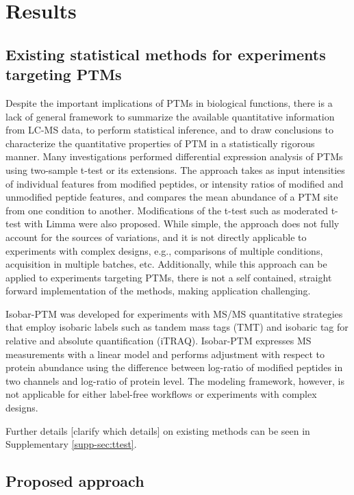 \documentclass[mcp]{article}
\numberwithin{figure}{section} %
\numberwithin{table}{section}
\def\todo#1{{\color{red}[#1]}}
\begin{document}
\section*{Results}

\subsection*{Existing statistical methods for experiments targeting PTMs}

Despite the important implications of PTMs in biological functions, there is a lack of general framework to summarize the available quantitative information from LC-MS data, to perform statistical inference, and to draw conclusions to characterize the quantitative properties of PTM in a statistically rigorous manner. Many investigations performed differential expression analysis of PTMs using two-sample t-test or its extensions. The approach takes as input intensities of individual features from modified peptides, or intensity ratios of modified and unmodified peptide features, and compares the mean abundance of a PTM site from one condition to another. Modifications of the t-test such as moderated t-test with Limma were also proposed.\cite{Zhu} While simple, the approach does not fully account for the sources of variations, and it is not directly applicable to experiments with complex designs, e.g., comparisons of multiple conditions, acquisition in multiple batches, etc. Additionally, while this approach can be applied to experiments targeting PTMs, there is not a self contained, straight forward implementation of the methods, making application challenging. 

Isobar-PTM was developed for experiments with MS/MS quantitative strategies that employ isobaric labels such as tandem mass tags (TMT) and isobaric tag for relative and absolute quantification (iTRAQ).\cite{Breitwieser:2013} Isobar-PTM expresses MS measurements with a linear model and performs adjustment with respect to protein abundance using the difference between log-ratio of modified peptides in two channels and log-ratio of protein level. The modeling framework, however, is not applicable for either label-free workflows or experiments with complex designs. 

Further details \todo{clarify which details}  on existing methods can be seen in Supplementary \ref{supp-sec:ttest}.

\subsection*{Proposed approach}
\end{document}

